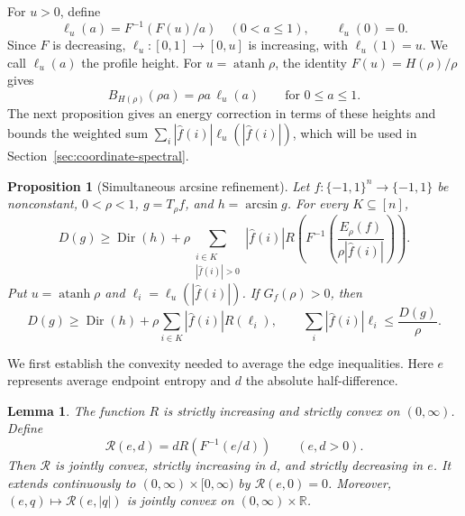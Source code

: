 \documentclass[11pt,letterpaper]{amsart}
\newcommand{\R}{\mathbb R}
\newcommand{\1}{\mathbf 1}
\DeclareMathOperator{\atanh}{atanh}
\newtheorem{lemma}[theorem]{Lemma}
\newtheorem{proposition}[theorem]{Proposition}
\numberwithin{equation}{section}
\begin{document}
For $u>0$, define
\begin{equation}\label{eq:profile-height}
 \ell_u(a)=F^{-1}(F(u)/a)\quad(0<a\le1),
 \qquad
 \ell_u(0)=0.
\end{equation}
Since $F$ is decreasing, $\ell_u:[0,1]\to[0,u]$ is increasing,
with $\ell_u(1)=u$.
We call $\ell_u(a)$ the profile height.
For $u=\atanh\rho$, the identity $F(u)=H(\rho)/\rho$ gives
\[
 B_{H(\rho)}(\rho a)=\rho a\,\ell_u(a)
 \qquad \text{for } 0\le a\le 1.
\]
The next proposition gives an energy correction in terms of
these heights and bounds the weighted sum
$\sum_i|\widehat f(i)|\ell_u(|\widehat f(i)|)$,
which will be used in Section~\ref{sec:coordinate-spectral}.

\begin{proposition}[Simultaneous arcsine refinement]
\label{fh:simultaneous-refund}
Let $f:\{-1,1\}^n\to\{-1,1\}$ be nonconstant,
$0<\rho<1$, $g=T_\rho f$, and $h=\arcsin g$.
For every $K\subseteq[n]$,
\[
 D(g)\ge\operatorname{Dir}(h)
 +\rho\sum_{\substack{i\in K\\|\widehat f(i)|>0}}
 |\widehat f(i)|
 R\left(F^{-1}\left(
       \frac{E_\rho(f)}{\rho|\widehat f(i)|}\right)\right).
\]
Put $u=\atanh\rho$ and
$\ell_i=\ell_u(|\widehat f(i)|)$.
If $G_f(\rho)>0$, then
\[
 D(g)\ge\operatorname{Dir}(h)
       +\rho\sum_{i\in K}|\widehat f(i)|R(\ell_i),
 \qquad
 \sum_i|\widehat f(i)|\ell_i\le\frac{D(g)}{\rho}.
\]
\end{proposition}

We first establish the convexity needed to average the edge
inequalities. Here $e$ represents average endpoint entropy
and $d$ the absolute half-difference.

\begin{lemma}\label{fh:refund-convexity}
The function $R$ is strictly increasing and strictly convex
on $(0,\infty)$.
Define
\begin{equation}\label{eq:edge-remainder}
 \mathcal R(e,d)=dR(F^{-1}(e/d))
 \qquad(e,d>0).
\end{equation}
Then $\mathcal R$ is jointly convex, strictly increasing in $d$,
and strictly decreasing in $e$.
It extends continuously to $(0,\infty)\times[0,\infty)$
by $\mathcal R(e,0)=0$.
Moreover, $(e,q)\mapsto\mathcal R(e,|q|)$ is jointly convex
on $(0,\infty)\times\R$.
\end{lemma}
\end{document}
